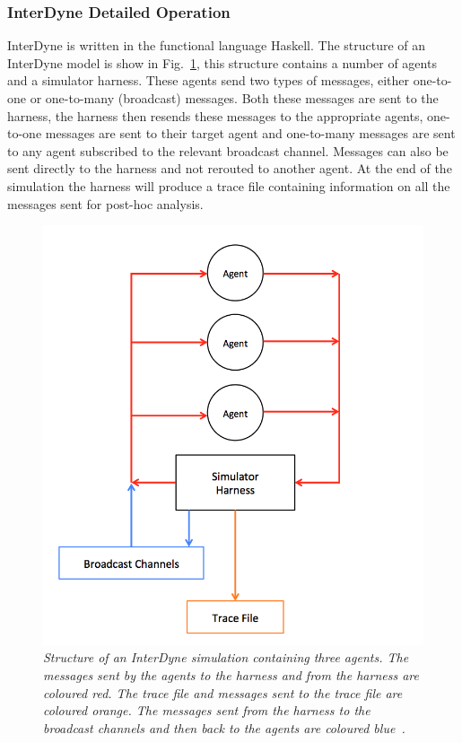 \documentclass{article}
\begin{document}
\subsubsection{InterDyne Detailed Operation}
InterDyne is written in the functional language Haskell. The structure of an InterDyne model is show in Fig.~\ref{fig:harness_setupfigure}, this structure contains a number of agents and a simulator harness. These agents send two types of messages, either one-to-one or one-to-many (broadcast) messages. Both these messages are sent to the harness, the harness then resends these messages to the appropriate agents, one-to-one messages are sent to their target agent and one-to-many messages are sent to any agent subscribed to the relevant broadcast channel. Messages can also be sent directly to the harness and not rerouted to another agent. At the end of the simulation the harness will produce a trace file containing information on all the messages sent for post-hoc analysis.    
\begin{figure}[H]
	\centering
	\includegraphics[scale=0.5]{harness_setup}
	\caption{\it Structure of an InterDyne simulation containing three agents. The messages sent by the agents to the harness and from the harness are coloured red. The trace file and messages sent to the trace file are coloured orange. The messages sent from the harness to the broadcast channels and then back to the agents are coloured blue~\cite{interdynemanual}.}
	\label{fig:harness_setupfigure}
\end{figure} 
\end{document}
